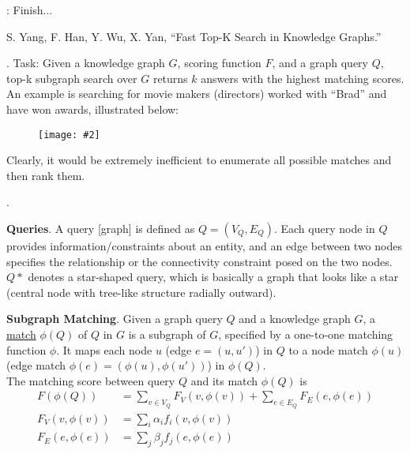\documentclass[11pt]{article}
\newcommand\myfig[2][0.3\textwidth]{\begin{figure}[h!]\centering\texttt{[image: \#2]}\end{figure}}
\newcommand\myspace[1][]{\vspace{#1\bigskipamount}}
\newcommand\p{\Needspace{10\baselineskip} \noindent}
\begin{document}
: Finish...


\vspace{-1em}
{\footnotesize S. Yang, F. Han, Y. Wu, X. Yan, ``Fast Top-K Search in Knowledge Graphs.''}

\p {}. Task: Given a knowledge graph $G$, scoring function $F$, and a graph query $Q$, top-k subgraph search over $G$ returns $k$ answers with the highest matching scores. An example is searching for movie makers (directors) worked with ``Brad'' and have won awards, illustrated below:
\myfig[0.4\textwidth]{TopKQuery.png}

Clearly, it would be extremely inefficient to enumerate all possible matches and then rank them.

\myspace
\p {}.
\begin{compactitem}
	\item \textbf{Queries}. A query [graph] is defined as $Q = (V_Q, E_Q)$. Each query node in $Q$ provides information/constraints about an entity, and an edge between two nodes specifies the relationship or the connectivity constraint posed on the two nodes. $Q*$ denotes a star-shaped query, which is basically a graph that looks like a star (central node with tree-like structure radially outward). 
	
	\item \textbf{Subgraph Matching}. Given a graph query $Q$ and a knowledge graph $G$, a \underline{match} $\phi(Q)$ of $Q$ in $G$ is a subgraph of $G$, specified by a one-to-one matching function $\phi$. It maps each node $u$ (edge $e=(u, u')$) in $Q$ to a node match $\phi(u)$ (edge match $\phi(e)=(\phi(u), \phi(u'))$) in $\phi(Q)$. \\
	
	\p The matching score between query $Q$ and its match $\phi(Q)$ is
	\begin{align}
		F(\phi(Q)) &= \sum_{v \in V_Q} F_V(v, \phi(v)) + \sum_{e \in E_Q} F_E(e, \phi(e)) \\
		F_V(v, \phi(v)) &= \sum_i \alpha_i f_i(v, \phi(v)) \\
		F_E(e, \phi(e)) &= \sum_j \beta_j f_j(e, \phi(e))
	\end{align}
\end{compactitem}
\end{document}
